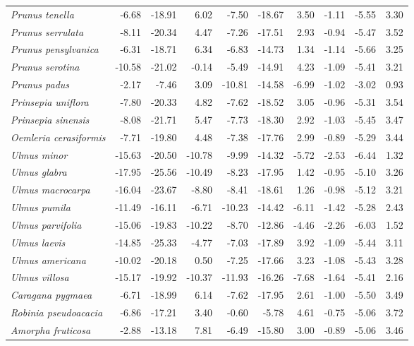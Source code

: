 \documentclass[11pt]{article}
\begin{document}
\begin{longtable}{lrrrrrrrrr}
  \emph{Prunus tenella} & -6.68 & -18.91 & 6.02 & -7.50 & -18.67 & 3.50 & -1.11 & -5.55 & 3.30 \\ 
  \emph{Prunus serrulata} & -8.11 & -20.34 & 4.47 & -7.26 & -17.51 & 2.93 & -0.94 & -5.47 & 3.52 \\ 
  \emph{Prunus pensylvanica} & -6.31 & -18.71 & 6.34 & -6.83 & -14.73 & 1.34 & -1.14 & -5.66 & 3.25 \\ 
  \emph{Prunus serotina} & -10.58 & -21.02 & -0.14 & -5.49 & -14.91 & 4.23 & -1.09 & -5.41 & 3.21 \\ 
  \emph{Prunus padus} & -2.17 & -7.46 & 3.09 & -10.81 & -14.58 & -6.99 & -1.02 & -3.02 & 0.93 \\ 
  \emph{Prinsepia uniflora} & -7.80 & -20.33 & 4.82 & -7.62 & -18.52 & 3.05 & -0.96 & -5.31 & 3.54 \\ 
  \emph{Prinsepia sinensis} & -8.08 & -21.71 & 5.47 & -7.73 & -18.30 & 2.92 & -1.03 & -5.45 & 3.47 \\ 
  \emph{Oemleria cerasiformis} & -7.71 & -19.80 & 4.48 & -7.38 & -17.76 & 2.99 & -0.89 & -5.29 & 3.44 \\ 
  \emph{Ulmus minor} & -15.63 & -20.50 & -10.78 & -9.99 & -14.32 & -5.72 & -2.53 & -6.44 & 1.32 \\ 
  \emph{Ulmus glabra} & -17.95 & -25.56 & -10.49 & -8.23 & -17.95 & 1.42 & -0.95 & -5.10 & 3.26 \\ 
  \emph{Ulmus macrocarpa} & -16.04 & -23.67 & -8.80 & -8.41 & -18.61 & 1.26 & -0.98 & -5.12 & 3.21 \\ 
  \emph{Ulmus pumila} & -11.49 & -16.11 & -6.71 & -10.23 & -14.42 & -6.11 & -1.42 & -5.28 & 2.43 \\ 
  \emph{Ulmus parvifolia} & -15.06 & -19.83 & -10.22 & -8.70 & -12.86 & -4.46 & -2.26 & -6.03 & 1.52 \\ 
  \emph{Ulmus laevis} & -14.85 & -25.33 & -4.77 & -7.03 & -17.89 & 3.92 & -1.09 & -5.44 & 3.11 \\ 
  \emph{Ulmus americana} & -10.02 & -20.18 & 0.50 & -7.25 & -17.66 & 3.23 & -1.08 & -5.43 & 3.28 \\ 
  \emph{Ulmus villosa} & -15.17 & -19.92 & -10.37 & -11.93 & -16.26 & -7.68 & -1.64 & -5.41 & 2.16 \\ 
  \emph{Caragana pygmaea} & -6.71 & -18.99 & 6.14 & -7.62 & -17.95 & 2.61 & -1.00 & -5.50 & 3.49 \\ 
  \emph{Robinia pseudoacacia} & -6.86 & -17.21 & 3.40 & -0.60 & -5.78 & 4.61 & -0.75 & -5.06 & 3.72 \\ 
  \emph{Amorpha fruticosa} & -2.88 & -13.18 & 7.81 & -6.49 & -15.80 & 3.00 & -0.89 & -5.06 & 3.46 \\ 

\end{longtable}
\end{document}

